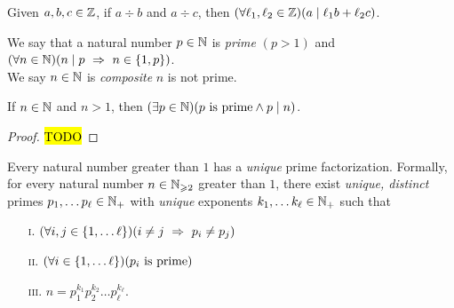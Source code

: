 \begin{corollary}
    Given $a, b, c \in \mathbb{Z}$, if $a \div b$ and $a \div c$,
    then $\pn*{\forall \ell_1, \ell_2 \in \Z}\pn*{a \div \ell_1b + \ell_2c}$.
\end{corollary}

\begin{definition}[Primality]
    We say that a natural number $p \in \mathbb{N}$ is \emph{prime} \iffbydefn 
    $(p > 1)$ and $\pn*{\forall n \in \N}\pn*{n \div p \implies n \in \set*{1, p}}$.\\
    We say $n \in \mathbb{N}$ is \emph{composite} \iffbydefn $n$ is not prime.
\end{definition}

\begin{lemma}
    If $n \in \mathbb{N}$ and $n > 1$, then $\pn*{\exists p \in \N}\pn*{p \text{ is prime} \meet p \div n}$.
\end{lemma}
\begin{proof}
    \hl{TODO}
\end{proof}

\begin{theorem}
    Every natural number greater than $1$ has a \emph{unique} prime factorization.
    Formally, for every natural number $n \in \mathbb{N}_{\geqslant 2}$ greater than $1$,
    there exist \emph{unique, distinct} primes $p_1, \dots p_\ell \in \mathbb{N}_+$
    with \emph{unique} exponents $k_1, \dots k_\ell \in \mathbb{N}_+$ such that
    \begin{enumerate}
        \item[\textsc{i.}]
            $\pn*{\forall i, j \in \set*{1, \dots \ell}}\pn*{i \neq j \implies p_i \neq p_j}$
        \item[\textsc{ii.}]
            $\pn*{\forall i \in \set*{1, \dots \ell}}\pn*{p_i \text{ is prime}}$
        \item[\textsc{iii.}]
            $n = p_1^{k_1} p_2^{k_2} \dots p_\ell^{k_\ell}$.
    \end{enumerate}
\end{theorem}

